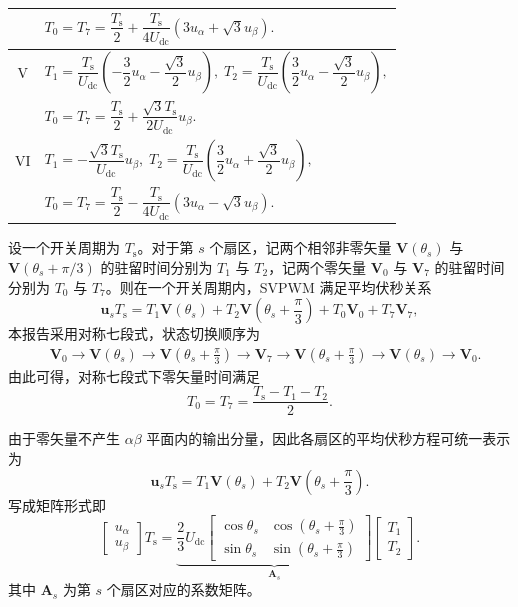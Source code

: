 \documentclass[a4paper, 12pt]{ctexart}
\newcommand{\Ts}{T_{\mathrm{s}}}
\newcommand{\Udc}{U_{\mathrm{dc}}}
\begin{document}
\begin{table}[!t]
\begin{tabularx}{\textwidth}{c >{\raggedright\arraybackslash}X}
        &
    $T_0 = T_7 = \dfrac{\Ts}{2} + \dfrac{\Ts}{4\Udc}\!\left(3u_\alpha + \sqrt{3}u_\beta\right).$ \\
    \midrule
    V   &
    $T_1 = \dfrac{\Ts}{\Udc}\!\left(-\dfrac{3}{2}u_\alpha - \dfrac{\sqrt{3}}{2}u_\beta\right),\;
    T_2 = \dfrac{\Ts}{\Udc}\!\left(\dfrac{3}{2}u_\alpha - \dfrac{\sqrt{3}}{2}u_\beta\right),$    \\
        &
    $T_0 = T_7 = \dfrac{\Ts}{2} + \dfrac{\sqrt{3}\Ts}{2\Udc}u_\beta.$                            \\
    \midrule
    VI  &
    $T_1 = -\dfrac{\sqrt{3}\Ts}{\Udc}u_\beta,\;
    T_2 = \dfrac{\Ts}{\Udc}\!\left(\dfrac{3}{2}u_\alpha + \dfrac{\sqrt{3}}{2}u_\beta\right),$    \\
        &
    $T_0 = T_7 = \dfrac{\Ts}{2} - \dfrac{\Ts}{4\Udc}\!\left(3u_\alpha - \sqrt{3}u_\beta\right).$ \\
    \bottomrule
  \end{tabularx}
\end{table}

设一个开关周期为 $\Ts$。对于第 $s$ 个扇区，记两个相邻非零矢量 $\boldsymbol V(\theta_s)$ 与 $\boldsymbol V(\theta_s + \pi / 3)$ 的驻留时间分别为 $T_1$ 与 $T_2$，记两个零矢量 $\boldsymbol V_0$ 与 $\boldsymbol V_7$ 的驻留时间分别为 $T_0$ 与 $T_7$。则在一个开关周期内，SVPWM 满足平均伏秒关系
\[
  \boldsymbol u_s \Ts
  =
  T_1 \boldsymbol V(\theta_s)
  + T_2 \boldsymbol V\!\left(\theta_s + \frac{\pi}{3}\right)
  + T_0 \boldsymbol V_0
  + T_7 \boldsymbol V_7,
\]
本报告采用对称七段式，状态切换顺序为
\[
  \begin{aligned}
     & \boldsymbol V_0
    \rightarrow
    \boldsymbol V(\theta_s)
    \rightarrow
    \boldsymbol V\!\left(\theta_s + \frac{\pi}{3}\right)
    \rightarrow
    \boldsymbol V_7
    \rightarrow
    \boldsymbol V\!\left(\theta_s + \frac{\pi}{3}\right)
    \rightarrow
    \boldsymbol V(\theta_s)
    \rightarrow
    \boldsymbol V_0.
  \end{aligned}
\]
由此可得，对称七段式下零矢量时间满足
\[
  T_0 = T_7 = \frac{\Ts - T_1 - T_2}{2}.
\]

由于零矢量不产生 $\alpha\beta$ 平面内的输出分量，因此各扇区的平均伏秒方程可统一表示为
\[
  \boldsymbol u_s \Ts
  =
  T_1 \boldsymbol V(\theta_s)
  +
  T_2 \boldsymbol V\!\left(\theta_s + \frac{\pi}{3}\right).
\]
写成矩阵形式即
\[
  \begin{bmatrix}
    u_\alpha \\ u_\beta
  \end{bmatrix}\Ts
  =
  \underbrace{
    \frac{2}{3}\Udc
    \begin{bmatrix}
      \cos\theta_s & \cos\!\left(\theta_s + \frac{\pi}{3}\right) \\
      \sin\theta_s & \sin\!\left(\theta_s + \frac{\pi}{3}\right)
    \end{bmatrix}
  }_{\boldsymbol A_s}
  \begin{bmatrix}
    T_1 \\ T_2
  \end{bmatrix}.
\]
其中 $\boldsymbol A_s$ 为第 $s$ 个扇区对应的系数矩阵。
\end{document}

